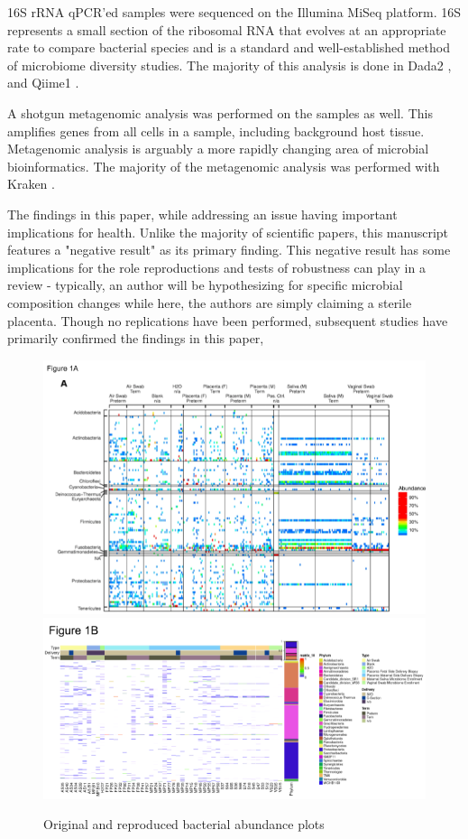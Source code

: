\documentclass{drexelthesis}
\begin{document}
16S rRNA qPCR'ed samples were sequenced on the Illumina MiSeq platform. 16S represents a small section of the ribosomal RNA that evolves at an appropriate rate to compare bacterial species and is a standard and well-established method of microbiome diversity studies. The majority of this analysis is done in Dada2 \cite{Callahan2015-eu}, and Qiime1 \cite{Caporaso2010-rh}.

A shotgun metagenomic analysis was performed on the samples as well. This amplifies genes from all cells in a sample, including background host tissue. Metagenomic analysis is arguably a more rapidly changing area of microbial bioinformatics. The majority of the metagenomic analysis was performed with Kraken \cite{Wood2014-zm}.

The findings in this paper, while addressing an issue having important implications for health. Unlike the majority of scientific papers, this manuscript features a "negative result" as its primary finding. This negative result has some implications for the role reproductions and tests of robustness can play in a review - typically, an author will be hypothesizing for specific microbial composition changes while here, the authors are simply claiming a sterile placenta. Though no replications have been performed, subsequent studies \cite{De_Goffau2019-zm} have primarily confirmed the findings in this paper, 

\newpage

\begin{figure}[h!]
	\centering
	\includegraphics[width=\textwidth]{./images/leibyorig.png}
	\includegraphics[width=\textwidth]{./images/leibyrepro.png}
	\caption{Original and reproduced bacterial abundance plots}
	\label{leibybac}
\end{figure}
\end{document}

